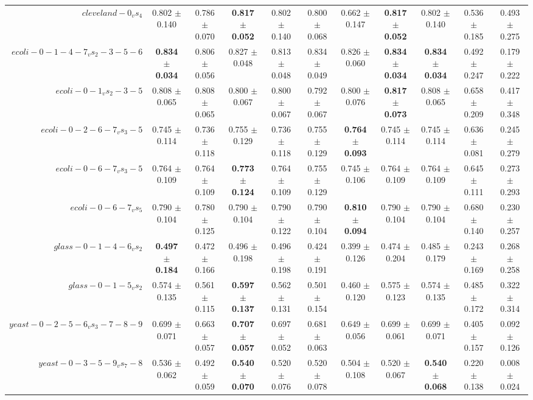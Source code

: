 \begin{table}[!ht]
{\begin{tabular}{r c c c c c c c c c c}
$cleveland-0_vs_4$ & 0.802 $\pm$ 0.140 & 0.786 $\pm$ 0.070 & \textbf{0.817 $\pm$ 0.052} & 0.802 $\pm$ 0.140 & 0.800 $\pm$ 0.068 & 0.662 $\pm$ 0.147 & \textbf{0.817 $\pm$ 0.052} & 0.802 $\pm$ 0.140 & 0.536 $\pm$ 0.185 & 0.493 $\pm$ 0.275 \\
$ecoli-0-1-4-7_vs_2-3-5-6$ & \textbf{0.834 $\pm$ 0.034} & 0.806 $\pm$ 0.056 & 0.827 $\pm$ 0.048 & 0.813 $\pm$ 0.048 & 0.834 $\pm$ 0.049 & 0.826 $\pm$ 0.060 & \textbf{0.834 $\pm$ 0.034} & \textbf{0.834 $\pm$ 0.034} & 0.492 $\pm$ 0.247 & 0.179 $\pm$ 0.222 \\
$ecoli-0-1_vs_2-3-5$ & 0.808 $\pm$ 0.065 & 0.808 $\pm$ 0.065 & 0.800 $\pm$ 0.067 & 0.800 $\pm$ 0.067 & 0.792 $\pm$ 0.067 & 0.800 $\pm$ 0.076 & \textbf{0.817 $\pm$ 0.073} & 0.808 $\pm$ 0.065 & 0.658 $\pm$ 0.209 & 0.417 $\pm$ 0.348 \\
$ecoli-0-2-6-7_vs_3-5$ & 0.745 $\pm$ 0.114 & 0.736 $\pm$ 0.118 & 0.755 $\pm$ 0.129 & 0.736 $\pm$ 0.118 & 0.755 $\pm$ 0.129 & \textbf{0.764 $\pm$ 0.093} & 0.745 $\pm$ 0.114 & 0.745 $\pm$ 0.114 & 0.636 $\pm$ 0.081 & 0.245 $\pm$ 0.279 \\
$ecoli-0-6-7_vs_3-5$ & 0.764 $\pm$ 0.109 & 0.764 $\pm$ 0.109 & \textbf{0.773 $\pm$ 0.124} & 0.764 $\pm$ 0.109 & 0.755 $\pm$ 0.129 & 0.745 $\pm$ 0.106 & 0.764 $\pm$ 0.109 & 0.764 $\pm$ 0.109 & 0.645 $\pm$ 0.111 & 0.273 $\pm$ 0.293 \\
$ecoli-0-6-7_vs_5$ & 0.790 $\pm$ 0.104 & 0.780 $\pm$ 0.125 & 0.790 $\pm$ 0.104 & 0.790 $\pm$ 0.122 & 0.790 $\pm$ 0.104 & \textbf{0.810 $\pm$ 0.094} & 0.790 $\pm$ 0.104 & 0.790 $\pm$ 0.104 & 0.680 $\pm$ 0.140 & 0.230 $\pm$ 0.257 \\
$glass-0-1-4-6_vs_2$ & \textbf{0.497 $\pm$ 0.184} & 0.472 $\pm$ 0.166 & 0.496 $\pm$ 0.198 & 0.496 $\pm$ 0.198 & 0.424 $\pm$ 0.191 & 0.399 $\pm$ 0.126 & 0.474 $\pm$ 0.204 & 0.485 $\pm$ 0.179 & 0.243 $\pm$ 0.169 & 0.268 $\pm$ 0.258 \\
$glass-0-1-5_vs_2$ & 0.574 $\pm$ 0.135 & 0.561 $\pm$ 0.115 & \textbf{0.597 $\pm$ 0.137} & 0.562 $\pm$ 0.131 & 0.501 $\pm$ 0.154 & 0.460 $\pm$ 0.120 & 0.575 $\pm$ 0.123 & 0.574 $\pm$ 0.135 & 0.485 $\pm$ 0.172 & 0.322 $\pm$ 0.314 \\
$yeast-0-2-5-6_vs_3-7-8-9$ & 0.699 $\pm$ 0.071 & 0.663 $\pm$ 0.057 & \textbf{0.707 $\pm$ 0.057} & 0.697 $\pm$ 0.052 & 0.681 $\pm$ 0.063 & 0.649 $\pm$ 0.056 & 0.699 $\pm$ 0.061 & 0.699 $\pm$ 0.071 & 0.405 $\pm$ 0.157 & 0.092 $\pm$ 0.126 \\
$yeast-0-3-5-9_vs_7-8$ & 0.536 $\pm$ 0.062 & 0.492 $\pm$ 0.059 & \textbf{0.540 $\pm$ 0.070} & 0.520 $\pm$ 0.076 & 0.520 $\pm$ 0.078 & 0.504 $\pm$ 0.108 & 0.520 $\pm$ 0.067 & \textbf{0.540 $\pm$ 0.068} & 0.220 $\pm$ 0.138 & 0.008 $\pm$ 0.024 \\

\end{tabular}}
\end{table}
